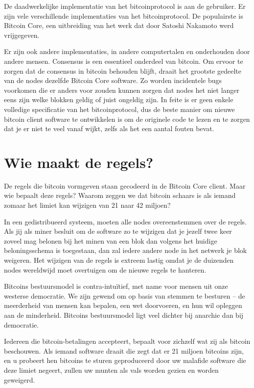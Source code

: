 \documentclass[smalldemyvopaper,11pt,twoside,onecolumn,openright,extrafontsizes]{memoir}
\begin{document}
De daadwerkelijke implementatie van het bitcoinprotocol is aan de gebruiker. Er zijn vele verschillende implementaties van het bitcoinprotocol. De populairste is Bitcoin Core, een uitbreiding van het werk dat door Satoshi Nakamoto werd vrijgegeven.

Er zijn ook andere implementaties, in andere computertalen en onderhouden door andere mensen. Consensus is een essentieel onderdeel van bitcoin. Om ervoor te zorgen dat de consensus in bitcoin behouden blijft, draait het grootste gedeelte van de nodes dezelfde Bitcoin Core software. Zo worden incidentele bugs voorkomen die er anders voor zouden kunnen zorgen dat nodes het niet langer eens zijn welke blokken geldig of juist ongeldig zijn. In feite is er geen enkele volledige specificatie van het bitcoinprotocol, dus de beste manier om nieuwe bitcoin client software te ontwikkelen is om de originele code te lezen en te zorgen dat je er niet te veel vanaf wijkt, zelfs als het een aantal fouten bevat.

\section{Wie maakt de regels?}

De regels die bitcoin vormgeven staan gecodeerd in de Bitcoin Core client. Maar wie bepaalt deze regels? Waarom zeggen we dat bitcoin schaars is als iemand zomaar het limiet kan wijzigen van 21 naar 42 miljoen?

In een gedistribueerd systeem, moeten alle nodes overeenstemmen over de regels. Als jij als miner besluit om de software zo te wijzigen dat je jezelf twee keer zoveel mag belonen bij het minen van een blok dan volgens het huidige beloningsschema is toegestaan, dan zal iedere andere node in het netwerk je blok weigeren. Het wijzigen van de regels is extreem lastig omdat je de duizenden nodes wereldwijd moet overtuigen om de nieuwe regels te hanteren.

Bitcoins bestuursmodel is contra-intuïtief, met name voor mensen uit onze westerse democratie. We zijn gewend om op basis van stemmen te besturen -- de meerderheid van mensen kan bepalen, een wet doorvoeren, en hun wil opleggen aan de minderheid. Bitcoins bestuursmodel ligt veel dichter bij anarchie dan bij democratie.

Iedereen die bitcoin-betalingen accepteert, bepaalt voor zichzelf wat zij als bitcoin beschouwen. Als iemand software draait die zegt dat er 21 miljoen bitcoins zijn, en u probeert hen bitcoins te sturen geproduceerd door uw malafide software die deze limiet negeert, zullen uw munten als vals worden gezien en worden geweigerd.
\end{document}
